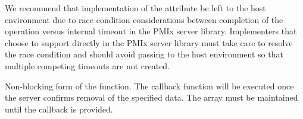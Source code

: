 
\optattrend

\adviceimplstart
We recommend that implementation of the  attribute be left to the host environment due to race condition considerations between completion of the operation versus internal timeout in the \ac{PMIx} server library. Implementers that choose to support  directly in the \ac{PMIx} server library must take care to resolve the race condition and should avoid passing  to the host environment so that multiple competing timeouts are not created.
\adviceimplend

\descr

Non-blocking form of the  function.
The callback function will be executed once the server confirms removal of the specified data. The  array must be maintained until the callback is provided.



